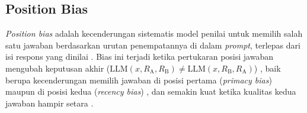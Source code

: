 \subsection{Position Bias}

\textit{Position bias} adalah kecenderungan sistematis model penilai untuk memilih salah satu jawaban berdasarkan urutan penempatannya di dalam \textit{prompt}, terlepas dari isi respons yang dinilai \cite{zhengJudgingLLMasaJudgeMTBench2023}\cite{shiJudgingJudgesSystematic}. Bias ini terjadi ketika pertukaran posisi jawaban mengubah keputusan akhir ($\text{LLM}(x, R_{\text{A}}, R_{\text{B}}) \neq \text{LLM}(x, R_{\text{B}}, R_{\text{A}})$) \cite{liSplitMergeAligning2024}, baik berupa kecenderungan memilih jawaban di posisi pertama (\textit{primacy bias}) maupun di posisi kedua (\textit{recency bias}) \cite{shiJudgingJudgesSystematic}, dan semakin kuat ketika kualitas kedua jawaban hampir setara \cite{liLLMsasJudgesComprehensiveSurvey2024}\cite{shiJudgingJudgesSystematic}.

